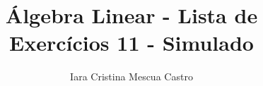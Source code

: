 \documentclass[leqno]{article}
\numberwithin{equation}{section}
\begin{document}
	
	\newtheorem{teo}{Teorema}[section] \newtheorem*{teo*}{Teorema}
	\newtheorem{prop}[teo]{Proposição} \newtheorem*{prop*}{Proposição}
	\newtheorem{lema}[teo]{Lemma} \newtheorem*{lema*}{Lema}
	\newtheorem{cor}[teo]{Corolário} \newtheorem*{cor*}{Corolário}
	
	\theoremstyle{definition}
	\newtheorem{defi}[teo]{Definição} \newtheorem*{defi*}{Definição}
	\newtheorem{exem}[teo]{Exemplo} \newtheorem*{exem*}{Exemplo}
	\newtheorem{obs}[teo]{Observação} \newtheorem*{obs*}{Observação}
	\newtheorem*{hipo}{Hipóteses}
	\newtheorem*{nota}{Notação}
	
	\newcommand{\ds}{\displaystyle} \newcommand{\nl}{\newline}
	\newcommand{\eps}{\varepsilon} \newcommand{\ssty}{\scriptstyle}
	\newcommand{\bE}{\mathbb{E}}
	\newcommand{\cB}{\mathcal{B}}
	\newcommand{\cF}{\mathcal{F}}
	\newcommand{\cA}{\mathcal{A}}
	\newcommand{\cM}{\mathcal{M}}
	\newcommand{\cD}{\mathcal{D}}
	\newcommand{\cN}{\mathcal{N}}
	\newcommand{\cL}{\mathcal{L}}
	\newcommand{\cLN}{\mathcal{LN}}
	\newcommand{\bP}{\mathbb{P}}
	\newcommand{\bQ}{\mathbb{Q}}
	\newcommand{\bN}{\mathbb{N}}
	\newcommand{\bR}{\mathbb{R}}
	\newcommand{\bZ}{\mathbb{Z}}
	
	\newcommand{\bfw}{\mathbf{w}}
	\newcommand{\bfv}{\mathbf{v}}
	\newcommand{\bfu}{\mathbf{u}}
	\newcommand{\bfx}{\mathbf{x}}
	\newcommand{\bfb}{\mathbf{b}}
	
	\newcommand{\bvecc}[2]{%
		\begin{bmatrix} #1 \\ #2  \end{bmatrix}
	}
	\newcommand{\bveccc}[3]{%
		\begin{bmatrix} #1 \\ #2 \\ #3  \end{bmatrix}
	}
	
	
	\title{Álgebra Linear - Lista de Exercícios 11 - Simulado}
	
	\author{Iara Cristina Mescua Castro} 
	
	\date{}
	
	\maketitle
	
\end{document}
